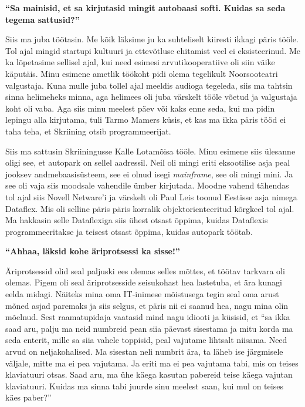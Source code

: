\textbf{\enquote{Sa mainisid, et sa kirjutasid mingit autobaasi softi. Kuidas 
sa seda tegema sattusid?}}

Siis ma juba töötasin. Me kõik läksime ju ka suhteliselt kiiresti ikkagi päris 
tööle. Tol ajal mingid startupi kultuuri ja ettevõtluse ehitamist veel ei 
eksisteerinud. Me ka lõpetasime sellisel ajal, kui need esimesi 
arvutikooperatiive oli siin väike käputäis. Minu esimene ametlik töökoht pidi 
olema tegelikult Noorsooteatri valgustaja. Kuna mulle juba 
tollel ajal meeldis audioga tegeleda, siis ma tahtsin sinna helimeheks minna, 
aga helimees oli juba värskelt tööle võetud ja valgustaja koht oli vaba. Aga 
siis minu meelest päev või kaks enne seda, kui ma pidin lepingu alla kirjutama, 
tuli Tarmo Mamers küsis, et kas ma ikka päris tööd ei 
taha teha, et Skriining otsib programmeerijat. 

Siis ma sattusin Skriiningusse Kalle Lotamõisa 
tööle. Minu esimene siis ülesanne oligi see, et autopark on sellel aadressil. 
Neil oli mingi eriti eksootilise asja peal jooksev andmebaasisüsteem, see ei 
olnud isegi \emph{mainframe}, see oli mingi mini. Ja  see oli vaja siis 
moodsale vahendile ümber kirjutada. Moodne vahend tähendas tol ajal siis Novell 
Netware'i ja värskelt oli Paul Leis toonud 
Eestisse asja nimega Dataflex. Mis oli selline päris 
päris korralik objektorienteeritud kõrgkeel tol ajal. Ma hakkasin selle 
Dataflexiga siis ühest otsast õppima, kuidas Dataflexis programmeeritakse ja 
teisest otsast õppima, kuidas autopark töötab. 

\textbf{\enquote{Ahhaa, läksid kohe äriprotsessi ka sisse!}}

Äriprotsessid olid seal paljuski ees olemas selles mõttes, et töötav tarkvara 
oli olemas. Pigem oli seal äriprotsesside seisukohast hea lastetuba, et ära 
kunagi eelda midagi. Näiteks mina oma IT-inimese mõistusega tegin seal oma 
arust mõned asjad paremaks ja siis selgus, et päris nii ei saanud hea, nagu 
mina olin mõelnud. Sest raamatupidaja vaatasid mind nagu idiooti ja küsisid, et 
\enquote{sa ikka saad aru, palju ma neid numbreid pean siia päevast sisestama 
ja mitu korda ma seda enterit, mille sa siia vahele toppisid, peal vajutame 
lihtsalt niisama. Need arvud on neljakohalised. Ma sisestan neli numbrit ära, 
ta läheb ise järgmisele väljale, mitte ma ei pea vajutama. Ja eriti ma ei pea 
vajutama tabi, mis on teises klaviatuuri otsas. Saad aru, ma ühe käega kasutan 
pabereid teise käega vajutan klaviatuuri. Kuidas ma sinna tabi juurde sinu 
meelest saan, kui mul on teises käes paber?} 

